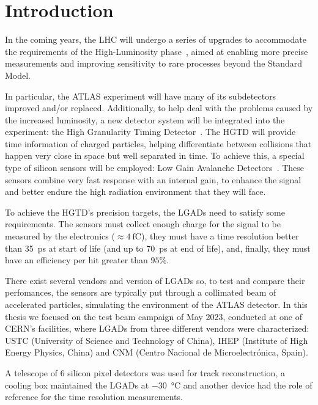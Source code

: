
\chapter*{Introduction}\label{chap:intro}

In the coming years, the LHC will undergo a series of upgrades to accommodate the requirements of the High-Luminosity phase~\cite{cernHLLHCProject}, aimed at enabling more precise measurements and improving sensitivity to rare processes beyond the Standard Model.

In particular, the ATLAS experiment will have many of its subdetectors improved and/or replaced. Additionally, to help deal with the problems caused by the increased luminosity, a new detector system will be integrated into the experiment: the High Granularity Timing Detector~\cite{cernTechnicalDesign}. The HGTD will provide time information of charged particles, helping differentiate between collisions that happen very close in space but well separated in time. To achieve this, a special type of silicon sensors will be employed: Low Gain Avalanche Detectors~\cite{PELLEGRINI201412}. These sensors combine very fast response with an internal gain, to enhance the signal and better endure the high radiation environment that they will face.

To achieve the HGTD's precision targets, the LGADs need to satisfy some requirements. The sensors must collect enough charge for the signal to be measured by the electronics (\(\approx \qty{4}{\femto\coulomb} \)), they must have a time resolution better than \qty{35}{\pico\second} at start of life (and up to \qty{70}{\pico\second} at end of life), and, finally, they must have an efficiency per hit greater than \(95\%\).

There exist several vendors and version of LGADs so, to test and compare their perfomances, the sensors are typically put through a collimated beam of accelerated particles, simulating the environment of the ATLAS detector. In this thesis we focused on the test beam campaign of May 2023, conducted at one of CERN's facilities, where LGADs from three different vendors were characterized: USTC (University of Science and Technology of China), IHEP (Institute of High Energy Physics, China) and CNM (Centro Nacional de Microelectr\'onica, Spain).

A telescope of 6 silicon pixel detectors was used for track reconstruction, a cooling box maintained the LGADs at \qty{-30}{\degreeCelsius} and another device had the role of reference for the time resolution measurements. 

